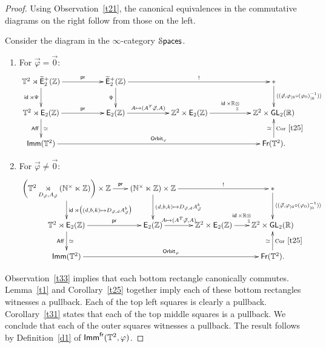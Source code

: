 \begin{proof}
Using Observation~\ref{t21}, the canonical equivalences in the commutative diagrams on the right follow from those on the left.  


Consider the diagram in the $\infty$-category $\operatorname{\mathcal S\mathsf{paces}}$.
\begin{enumerate}
\item
For $\vec{\varphi} = \vec{0}$:
\[
\xymatrix{
\TT^2 \rtimes\Ebraid
\ar[d]_-{\id \rtimes \Psi}
\ar[rr]^-{\pr}
&&
\Ebraid
\ar[d]_-{\Psi}
\ar[rrrr]^-{!}
&&
&&
\ast
\ar[d]^-{\lag (\vec{\varphi} , \varphi_{|0} \circ (\varphi_0)_{|0}^{-1})\rag}
\\
\TT^2 \rtimes \EZ 
\ar[d]_-{\Aff}^{\simeq}
\ar[rr]^-{\pr}
&&
\EZ
\ar[rr]^-{ A \mapsto (A^T \vec{\varphi} , A) }
&&
\ZZ^2 \times \EZ
\ar[rr]^-{\id \times \RR\underset{\ZZ}\ot }
&&
\ZZ^2 \times \GL_2(\RR)
\\
\Imm(\TT^2)
\ar[rrrrrr]^-{{\sf Orbit}_\varphi}
&&
&&
&&
\Fr(\TT^2)
\ar[u]_-{\rm Cor~\ref{t25}}^-{\simeq}
.
}
\]


\item
For $\vec{\varphi} \neq \vec{0}$:
\[
\xymatrix@C=.65em{
\left( \TT^2 \underset{D_{\vec{\varphi}} , A_{\vec{\varphi}}} \rtimes (\NN^\times \ltimes \ZZ ) \right) \times \ZZ
\ar[d]^-{\id \rtimes \bigl((d,b,k)\mapsto D_{\vec{\varphi},d} A_{\vec{\varphi}}^b\bigr)}
\ar[rr]^-{\pr}
&&
(\NN^\times \ltimes \ZZ ) \times \ZZ
\ar[d]^-{(d,b,k)\mapsto D_{\vec{\varphi},d} A_{\vec{\varphi}}^b}
\ar[rrrr]^-{!}
&&
&&
\ast
\ar[d]^-{\lag (\vec{\varphi} , \varphi_{|0} \circ (\varphi_0)_{|0}^{-1})\rag}
\\
\TT^2 \rtimes \EZ 
\ar[d]_-{\Aff}^{\simeq}
\ar[rr]^-{\pr}
&&
\EZ
\ar[rr]^-{ A \mapsto (A^T \vec{\varphi} , A) }
&&
\ZZ^2 \times \EZ
\ar[rr]^-{\id \times \RR\underset{\ZZ}\ot }
&&
\ZZ^2 \times \GL_2(\RR)
\\
\Imm(\TT^2)
\ar[rrrrrr]^-{{\sf Orbit}_\varphi}
&&
&&
&&
\Fr(\TT^2)
\ar[u]_-{\rm Cor~\ref{t25}}^-{\simeq}
.
}
\]

\end{enumerate}
Observation~\ref{t33} implies that each bottom rectangle canonically commutes.
Lemma~\ref{t1} and Corollary~\ref{t25} together imply each of these bottom rectangles witnesses a pullback.
Each of the top left squares is clearly a pullback.
Corollary~\ref{t31} states that each of the top middle squares is a pullback.
We conclude that each of the outer squares witnesses a pullback.  
The result follows by Definition~\ref{d1} of $\operatorname{\sf Imm}^{\operatorname{\sf fr}}(\mathbb T^2,\varphi)$.



\end{proof}



















